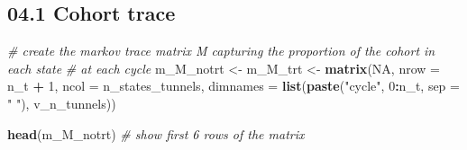 \documentclass[
]{article}
\newenvironment{Shaded}{\begin{snugshade}}{\end{snugshade}}
\newcommand{\CommentTok}[1]{\textcolor[rgb]{0.56,0.35,0.01}{\textit{#1}}}
\newcommand{\DataTypeTok}[1]{\textcolor[rgb]{0.13,0.29,0.53}{#1}}
\newcommand{\DecValTok}[1]{\textcolor[rgb]{0.00,0.00,0.81}{#1}}
\newcommand{\KeywordTok}[1]{\textcolor[rgb]{0.13,0.29,0.53}{\textbf{#1}}}
\newcommand{\NormalTok}[1]{#1}
\newcommand{\OperatorTok}[1]{\textcolor[rgb]{0.81,0.36,0.00}{\textbf{#1}}}
\newcommand{\OtherTok}[1]{\textcolor[rgb]{0.56,0.35,0.01}{#1}}
\newcommand{\StringTok}[1]{\textcolor[rgb]{0.31,0.60,0.02}{#1}}
\begin{document}
\hypertarget{cohort-trace}{%
\subsection{04.1 Cohort trace}\label{cohort-trace}}

\begin{Shaded}
\begin{Highlighting}[]
\CommentTok{# create the markov trace matrix M capturing the proportion of the cohort in each state }
\CommentTok{# at each cycle}
\NormalTok{m_M_notrt <-}\StringTok{ }\NormalTok{m_M_trt <-}\StringTok{ }\KeywordTok{matrix}\NormalTok{(}\OtherTok{NA}\NormalTok{, }
                               \DataTypeTok{nrow =}\NormalTok{ n_t }\OperatorTok{+}\StringTok{ }\DecValTok{1}\NormalTok{, }\DataTypeTok{ncol =}\NormalTok{ n_states_tunnels,}
                               \DataTypeTok{dimnames =} \KeywordTok{list}\NormalTok{(}\KeywordTok{paste}\NormalTok{(}\StringTok{"cycle"}\NormalTok{, }\DecValTok{0}\OperatorTok{:}\NormalTok{n_t, }\DataTypeTok{sep =} \StringTok{" "}\NormalTok{), v_n_tunnels)) }

\KeywordTok{head}\NormalTok{(m_M_notrt) }\CommentTok{# show first 6 rows of the matrix }
\end{Highlighting}
\end{Shaded}
\end{document}

